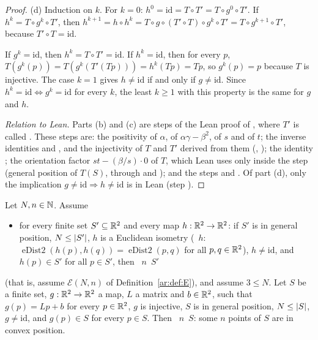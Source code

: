 \begin{proof}
(d) Induction on $k$. For $k=0$: $h^0=\mathrm{id}=T\circ T'=T\circ g^0\circ T'$. If $h^k=T\circ g^k\circ T'$, then
$h^{k+1}=h\circ h^k=T\circ g\circ(T'\circ T)\circ g^k\circ T'=T\circ g^{k+1}\circ T'$, because $T'\circ T=\mathrm{id}$.

If $g^k=\mathrm{id}$, then $h^k=T\circ T'=\mathrm{id}$. If $h^k=\mathrm{id}$, then for every $p$,
$T(g^k(p))=T(g^k(T'(Tp)))=h^k(Tp)=Tp$, so $g^k(p)=p$ because $T$ is injective. The case $k=1$ gives $h\ne\mathrm{id}$
if and only if $g\ne\mathrm{id}$. Since $h^k=\mathrm{id}\Leftrightarrow g^k=\mathrm{id}$ for every $k$, the least
$k\ge1$ with this property is the same for $g$ and $h$.

\emph{Relation to Lean.} Parts (b) and (c) are steps of the Lean proof of
, where $T'$ is called . These steps are: the positivity of $\alpha$,
of $\alpha\gamma-\beta^2$, of $s$ and of $t$; the inverse identities  and , and the injectivity of
$T$ and $T'$ derived from them (, ); the identity ; the orientation factor
$st-(\beta/s)\cdot0$ of $T$, which Lean uses only inside the step  (general position of $T(S)$, through
 and ); and the steps  and . Of
part (d), only the implication $g\ne\mathrm{id}\Rightarrow h\ne\mathrm{id}$ is in Lean (step ).
\end{proof}

\begin{theorem}\label{ar:thm:transfer}
Let $N,n\in\mathbb N$. Assume
\begin{itemize}
\item[\textup{(hE)}] for every finite set $S'\subseteq\mathbb R^2$ and every map $h:\mathbb R^2\to\mathbb R^2$: if $S'$ is in general
position, $N\le\lvert S'\rvert$, $h$ is a Euclidean isometry \textup(~$h$: $\operatorname{eDist2}(h(p),
h(q))=\operatorname{eDist2}(p,q)$ for all $p,q\in\mathbb R^2$\textup), $h\ne\mathrm{id}$, and $h(p)\in S'$ for all $p\in S'$,
then ~$n$~$S'$
\end{itemize}
\textup(that is, assume $\mathcal E(N,n)$ of Definition~\textup{\ref{ar:def:E}}\textup), and assume $3\le N$. Let $S$
be a finite set, $g:\mathbb R^2\to\mathbb R^2$ a map, $L$ a matrix and $b\in\mathbb R^2$, such that $g(p)=Lp+b$ for every $p\in\mathbb R^2$, $g$ is
injective, $S$ is in general position, $N\le\lvert S\rvert$, $g\ne\mathrm{id}$, and $g(p)\in S$ for every $p\in S$. Then
~$n$~$S$: some $n$ points of $S$ are in convex position.
\end{theorem}

